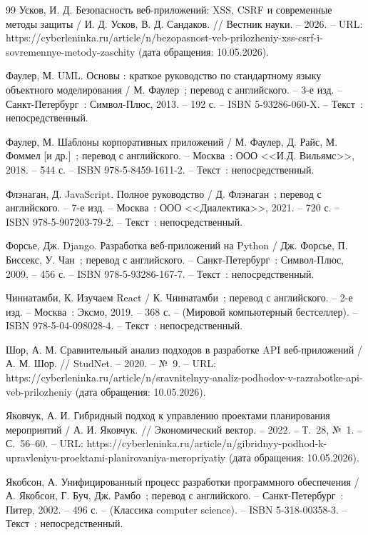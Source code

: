 \begin{thebibliography}{99}
	 Усков, И. Д. Безопасность веб-приложений: XSS, CSRF и современные методы защиты / И. Д. Усков, В. Д. Сандаков. // Вестник науки. -- 2026. -- URL: https://cyberleninka.ru/article/n/bezopasnost-veb-prilozheniy-xss-csrf-i-sovremennye-metody-zaschity (дата обращения: 10.05.2026).

	 Фаулер, М. UML. Основы : краткое руководство по стандартному языку объектного моделирования / М. Фаулер~; перевод с английского. -- 3-е изд. -- Санкт-Петербург~: Символ-Плюс, 2013. -- 192 с. -- ISBN 5-93286-060-X. -- Текст~: непосредственный.

	 Фаулер, М. Шаблоны корпоративных приложений / М. Фаулер, Д. Райс, М. Фоммел [и др.]~; перевод с английского. -- Москва~: ООО <<И.Д. Вильямс>>, 2018. -- 544 с. -- ISBN 978-5-8459-1611-2. -- Текст~: непосредственный.

	 Флэнаган, Д. JavaScript. Полное руководство / Д. Флэнаган~; перевод с английского. -- 7-е изд. -- Москва~: ООО <<Диалектика>>, 2021. -- 720 с. -- ISBN 978-5-907203-79-2. -- Текст~: непосредственный.

	 Форсье, Дж. Django. Разработка веб-приложений на Python / Дж. Форсье, П. Биссекс, У. Чан~; перевод с английского. -- Санкт-Петербург~: Символ-Плюс, 2009. -- 456 с. -- ISBN 978-5-93286-167-7. -- Текст~: непосредственный.

	 Чиннатамби, К. Изучаем React / К. Чиннатамби~; перевод с английского. -- 2-е изд. -- Москва~: Эксмо, 2019. -- 368 с. -- (Мировой компьютерный бестселлер). -- ISBN 978-5-04-098028-4. -- Текст~: непосредственный.

	 Шор, А. М. Сравнительный анализ подходов в разработке API веб-приложений / А. М. Шор. // StudNet. -- 2020. -- №~9. -- URL: https://cyberleninka.ru/article/n/sravnitelnyy-analiz-podhodov-v-razrabotke-api-veb-prilozheniy (дата обращения: 10.05.2026).

	 Яковчук, А. И. Гибридный подход к управлению проектами планирования мероприятий / А. И. Яковчук. // Экономический вектор. -- 2022. -- Т.~28, №~1. -- С.~56--60. -- URL: https://cyberleninka.ru/article/n/gibridnyy-podhod-k-upravleniyu-proektami-planirovaniya-meropriyatiy (дата обращения: 10.05.2026).

	 Якобсон, А. Унифицированный процесс разработки программного обеспечения / А. Якобсон, Г. Буч, Дж. Рамбо~; перевод с английского. -- Санкт-Петербург~: Питер, 2002. -- 496 с. -- (Классика computer science). -- ISBN 5-318-00358-3. -- Текст~: непосредственный.


\end{thebibliography}

